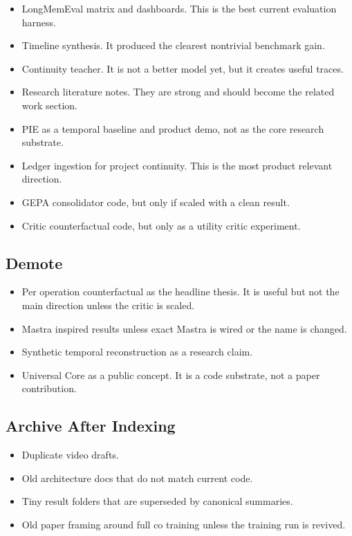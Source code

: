 \documentclass[11pt]{article}
\begin{document}
\begin{itemize}
  \item LongMemEval matrix and dashboards. This is the best current evaluation harness.
  \item Timeline synthesis. It produced the clearest nontrivial benchmark gain.
  \item Continuity teacher. It is not a better model yet, but it creates useful traces.
  \item Research literature notes. They are strong and should become the related work section.
  \item PIE as a temporal baseline and product demo, not as the core research substrate.
  \item Ledger ingestion for project continuity. This is the most product relevant direction.
  \item GEPA consolidator code, but only if scaled with a clean result.
  \item Critic counterfactual code, but only as a utility critic experiment.
\end{itemize}

\subsection{Demote}

\begin{itemize}
  \item Per operation counterfactual as the headline thesis. It is useful but not the main direction unless the critic is scaled.
  \item Mastra inspired results unless exact Mastra is wired or the name is changed.
  \item Synthetic temporal reconstruction as a research claim.
  \item Universal Core as a public concept. It is a code substrate, not a paper contribution.
\end{itemize}

\subsection{Archive After Indexing}

\begin{itemize}
  \item Duplicate video drafts.
  \item Old architecture docs that do not match current code.
  \item Tiny result folders that are superseded by canonical summaries.
  \item Old paper framing around full co training unless the training run is revived.
\end{itemize}
\end{document}
